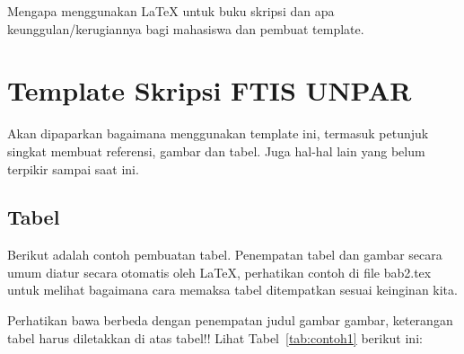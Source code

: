 Mengapa menggunakan \LaTeX{} untuk buku skripsi dan apa keunggulan/kerugiannya bagi mahasiswa dan pembuat template. 



\section{Template Skripsi FTIS UNPAR}
\label{sec:template}
 
Akan dipaparkan bagaimana menggunakan template ini, termasuk petunjuk singkat membuat referensi, gambar dan tabel.
Juga hal-hal lain yang belum terpikir sampai saat ini. 
 

\subsection{Tabel}  
Berikut adalah contoh pembuatan tabel. 
Penempatan tabel dan gambar secara umum diatur secara otomatis oleh \LaTeX{}, perhatikan contoh di file bab2.tex untuk melihat bagaimana cara memaksa tabel ditempatkan sesuai keinginan kita.

Perhatikan bawa berbeda dengan penempatan judul gambar gambar, keterangan tabel harus diletakkan di atas tabel!!
Lihat Tabel~\ref{tab:contoh1} berikut ini:

